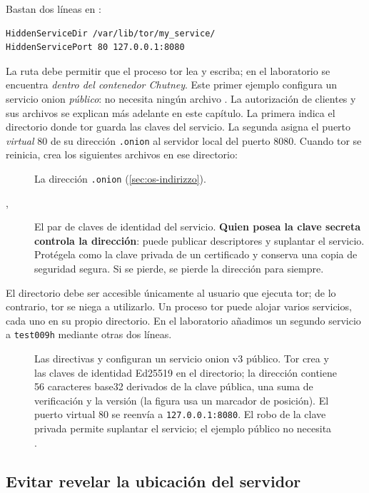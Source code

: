 Bastan dos líneas en :
\begin{lstlisting}[language=torrc]
HiddenServiceDir /var/lib/tor/my_service/
HiddenServicePort 80 127.0.0.1:8080
\end{lstlisting}
La ruta  debe permitir que el proceso tor lea y escriba; en el laboratorio se encuentra \emph{dentro del contenedor Chutney}. Este primer ejemplo configura un servicio onion \emph{público}: no necesita ningún archivo . La autorización de clientes y sus archivos  se explican más adelante en este capítulo.
La primera indica el directorio donde tor guarda las claves del servicio. La segunda asigna el puerto \emph{virtual} 80 de su dirección \texttt{.onion} al servidor local del puerto 8080. Cuando tor se reinicia, crea los siguientes archivos en ese directorio:
\begin{description}
  \item[] La dirección \texttt{.onion} (\cref{sec:os-indirizzo}).
  \item[, ] El par de claves de identidad del servicio. \textbf{Quien posea la clave secreta controla la dirección}: puede publicar descriptores y suplantar el servicio. Protégela como la clave privada de un certificado y conserva una copia de seguridad segura. Si se pierde, se pierde la dirección para siempre.
\end{description}
El directorio debe ser accesible únicamente al usuario que ejecuta tor; de lo contrario, tor se niega a utilizarlo. Un proceso tor puede alojar varios servicios, cada uno en su propio directorio. En el laboratorio añadimos un segundo servicio a \texttt{test009h} mediante otras dos líneas.

\begin{figure}[htbp]
\centering

\caption{Las directivas  y  configuran un servicio onion v3 público. Tor crea  y las claves de identidad Ed25519 en el directorio; la dirección contiene 56 caracteres base32 derivados de la clave pública, una suma de verificación y la versión (la figura usa un marcador de posición). El puerto virtual 80 se reenvía a \texttt{127.0.0.1:8080}. El robo de la clave privada permite suplantar el servicio; el ejemplo público no necesita .}
\label{fig:servizio}
\end{figure}

\subsection{Evitar revelar la ubicación del servidor}

